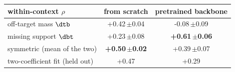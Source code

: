 \begin{tabular}{l cc}
\toprule
within-context $\rho$ & from scratch & pretrained backbone \\
\midrule
off-target mass $\dtb$ & +0.42\,{\scriptsize$\pm$0.04} & -0.08\,{\scriptsize$\pm$0.09} \\
missing support $\dbt$ & +0.23\,{\scriptsize$\pm$0.08} & \textbf{+0.61\,{\scriptsize$\pm$0.06}} \\
symmetric (mean of the two) & \textbf{+0.50\,{\scriptsize$\pm$0.02}} & +0.39\,{\scriptsize$\pm$0.07} \\
\addlinespace
two-coefficient fit (held out) & +0.47 & +0.29 \\
\bottomrule
\end{tabular}
